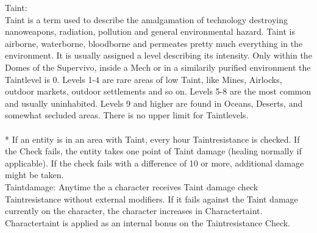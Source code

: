 \documentclass{article}
\begin{document}
Taint: \\
Taint is a term used to describe the amalgamation of technology destroying nanoweapons, radiation, pollution and general
environmental hazard. Taint is airborne, waterborne, bloodborne and permeates pretty much everything in the
environment. It is usually assigned a level describing its intensity. Only within the Domes of the Supervivo, inside a
Mech or in a similarily purified environment the Taintlevel is 0. Levels 1-4 are rare areas of low Taint, like Mines,
Airlocks, outdoor markets, outdoor settlements and so on. Levels 5-8 are the most common and usually uninhabited. Levels
9 and higher are found in Oceans, Deserts, and somewhat secluded areas. There is no upper limit for Taintlevels. \\\\*
If an entity is in an area with Taint, every hour Taintresistance is checked. If the Check fails, the entity takes
one point of Taint damage (healing normally if applicable). If the check fails with a difference of 10 or more,
additional damage might be taken.\\

Taintdamage: Anytime the a character receives Taint damage check Taintresistance without external modifiers. If it fails against the
Taint damage currently on the character, the character increases in Charactertaint.
Charactertaint is applied as an internal bonus on the Taintresistance Check. \\
\end{document}
